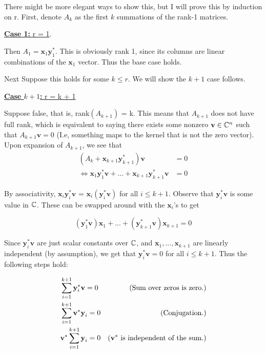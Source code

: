 \begin{solution}

    There might be more elegant ways to show this, but I will prove this by induction on r. First, denote $A_k$ as the first $k$ summations of the rank-1 matrices.

    \jump
    \underline{\textbf{Case 1:} r = 1}.
    \jump

    Then $A_1 = \textbf{x}_1\textbf{y}_1^*$. This is obviously rank 1, since its columns are linear combinations of the $\textbf{x}_1$ vector. Thus the base case holds. 

    Next Suppose this holds for some $k \leq r$. We will show the $k+1$ case follows. 

    \jump
    \underline{\textbf{Case $k + 1$:} r = k + 1}
    \jump
    
    Suppose false, that is, rank$(A_{k+1})$ = k. This means that $A_{k+1}$ does not have full rank, which is equivalent to saying there exists some nonzero $\textbf{v} \in \mathbb{C}^n$ such that $A_{k+1}\textbf{v} = 0$ (I.e, something maps to the kernel that is not the zero vector). Upon expansion of $A_{k+1}$, we see that
    \begin{align}
        (A_k + \textbf{x}_{k+1}\textbf{y}^*_{k+1})\textbf{v} &= 0 \nonumber\\
        \iff \textbf{x}_{1}\textbf{y}^*_{1}\textbf{v} + ... + \textbf{x}_{k+1}\textbf{y}^*_{k+1}\textbf{v} &= 0 \nonumber
    \end{align}

    By associativity, $\textbf{x}_{i}\textbf{y}^*_{i}\textbf{v}$ = $\textbf{x}_{i}(\textbf{y}^*_{i}\textbf{v})$ for all $i \leq k+1$. Observe that $\textbf{y}^*_{i}\textbf{v}$ is some value in $\mathbb{C}$. These can be swapped around with the  $\textbf{x}_i$'s to get

    \[
    (\textbf{y}^*_{1}\textbf{v})\textbf{x}_{1} + ... + (\textbf{y}^*_{k+1}\textbf{v})\textbf{x}_{k+1} = 0 
    \]

    Since $\textbf{y}^*_{i}\textbf{v}$ are just scalar constants over $\mathbb{C}$, and $\textbf{x}_1, ..., \textbf{x}_{k+1}$ are linearly independent (by assumption), we get that $\textbf{y}^*_{i}\textbf{v} = 0$ for all $i \leq k+1$. Thus the following steps hold:

    \alignbreak
    \begin{align}
        &\sum_{i = 1}^{k+1}\textbf{y}_i^* \textbf{v} = 0 &\text{(Sum over zeros is zero.)}\nonumber\\
        &\sum_{i = 1}^{k+1}\textbf{v}^*\textbf{y}_i  = 0 &\text{(Conjugation.)}\nonumber\\
        &\textbf{v}^*\sum_{i = 1}^{k+1}\textbf{y}_i = 0 &\text{(\textbf{v}$^*$ is independent of the sum.)}\nonumber
    \end{align}
    \alignbreak


\end{solution}
